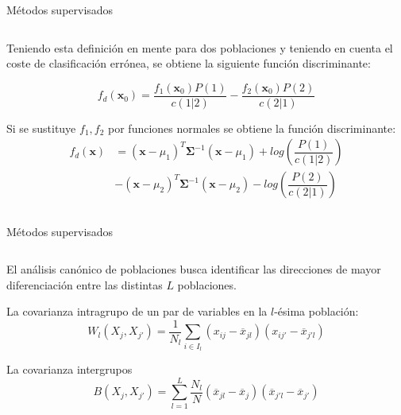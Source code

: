 \begin{frame}{Métodos supervisados}
\begin{columns}
\begin{column}{0.9\textwidth}
Teniendo esta definición en mente para dos poblaciones y teniendo  en cuenta el coste de clasificación errónea, se obtiene la siguiente función discriminante:

\begin{equation}
f_d(\mathbf{x}_0)=\dfrac{f_1(\textbf{x}_0)P(1)}{c(1|2)}-\dfrac{f_2(\textbf{x}_0)P(2)}{c(2|1)}
\end{equation}

Si se sustituye $f_1,f_2$ por funciones normales se obtiene la función discriminante: 
\begin{equation}
\begin{split}
f_d(\mathbf{x})&=(\textbf{x}-\mu_1)^T \mathbf{\Sigma}^{-1}(\textbf{x}-\mu_1)+log\left(\dfrac{P(1)}{c(1|2)}\right)\\&-(\textbf{x}-\mu_2)^T \mathbf{\Sigma}^{-1} (\textbf{x}-\mu_2)-log\left(\dfrac{P(2)}{c(2|1)}\right)
\end{split}
\end{equation}

\end{column}
\end{columns}
\end{frame}

\begin{frame}{Métodos supervisados}
\begin{columns}
\begin{column}{0.9\textwidth}

El análisis canónico de poblaciones busca identificar las direcciones de mayor diferenciación entre las distintas $L$ poblaciones.
\begin{defi}
\noindent La covarianza intragrupo de un par de variables en la $l$-ésima población:
\begin{equation}
W_l(X_j,X_{j'})=\dfrac{1}{N_l}\sum_{i\in I_l} (x_{ij}-\overline{x}_{jl})(x_{ij'}-\overline{x}_{j'l})
\end{equation}   
\end{defi}
\begin{defi}
La covarianza intergrupos
\begin{equation}
B(X_j,X_{j'})=\sum_{l=1}^L\dfrac{N_l}{N}(\overline{x}_{jl}-\overline{x}_{j})(\overline{x}_{j'l}-\overline{x}_{j'})
\end{equation}   
\end{defi}

\end{column}
\end{columns}
\end{frame}

